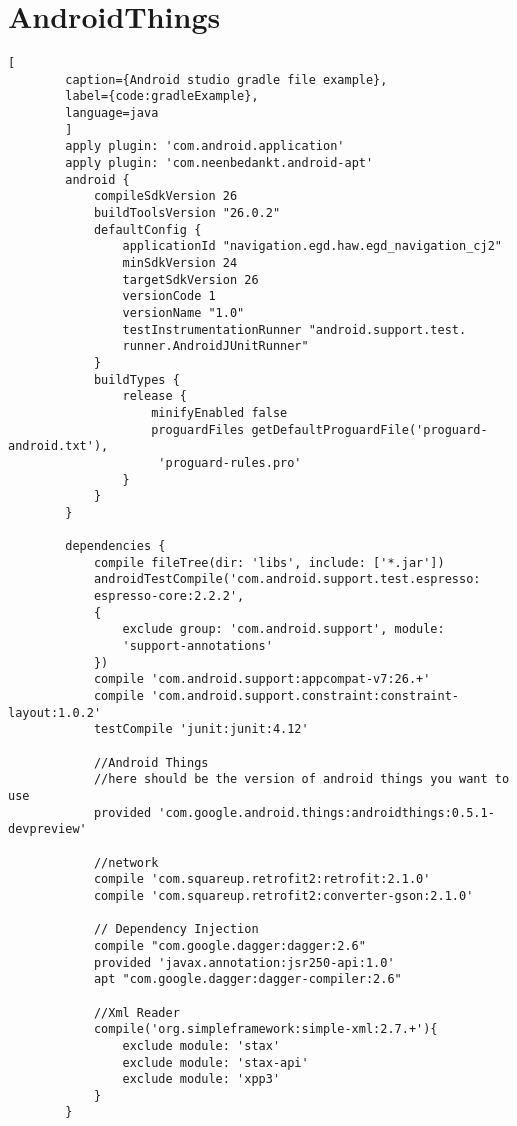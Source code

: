 \section{AndroidThings}
    \begin{lstlisting}[
        caption={Android studio gradle file example},
        label={code:gradleExample},
        language=java
        ]
        apply plugin: 'com.android.application'
        apply plugin: 'com.neenbedankt.android-apt'
        android {
            compileSdkVersion 26
            buildToolsVersion "26.0.2"
            defaultConfig {
                applicationId "navigation.egd.haw.egd_navigation_cj2"
                minSdkVersion 24
                targetSdkVersion 26
                versionCode 1
                versionName "1.0"
                testInstrumentationRunner "android.support.test.
                runner.AndroidJUnitRunner"
            }
            buildTypes {
                release {
                    minifyEnabled false
                    proguardFiles getDefaultProguardFile('proguard-android.txt'),
                     'proguard-rules.pro'
                }
            }
        }
        
        dependencies {
            compile fileTree(dir: 'libs', include: ['*.jar'])
            androidTestCompile('com.android.support.test.espresso:
            espresso-core:2.2.2', 
            {
                exclude group: 'com.android.support', module: 
                'support-annotations'
            })
            compile 'com.android.support:appcompat-v7:26.+'
            compile 'com.android.support.constraint:constraint-layout:1.0.2'
            testCompile 'junit:junit:4.12'
        
            //Android Things
            //here should be the version of android things you want to use
            provided 'com.google.android.things:androidthings:0.5.1-devpreview'
        
            //network
            compile 'com.squareup.retrofit2:retrofit:2.1.0'
            compile 'com.squareup.retrofit2:converter-gson:2.1.0'
        
            // Dependency Injection
            compile "com.google.dagger:dagger:2.6"
            provided 'javax.annotation:jsr250-api:1.0'
            apt "com.google.dagger:dagger-compiler:2.6"
        
            //Xml Reader
            compile('org.simpleframework:simple-xml:2.7.+'){
                exclude module: 'stax'
                exclude module: 'stax-api'
                exclude module: 'xpp3'
            }
        }
         
    \end{lstlisting} 